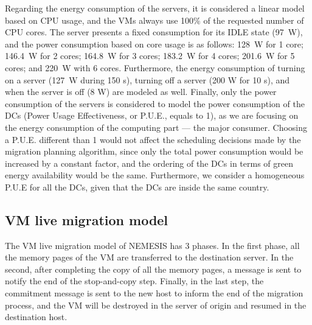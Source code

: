Regarding the energy consumption of the servers, it is considered a linear model based on CPU usage, and the VMs always use 100\% of the requested number of CPU cores. The server presents a fixed consumption for its IDLE state (97~W), and the power consumption based on core usage is as follows: 128~W for 1 core; 146.4~W for 2 cores; 164.8~W for 3 cores; 183.2~W for 4 cores; 201.6~W for 5 cores; and 220~W with 6 cores. Furthermore, the energy consumption of turning on a server (127~W during 150 s), turning off a server (200 W for 10 s), and when the server is off (8 W) are modeled as well. Finally, only the power consumption of the servers is considered to model the power consumption of the DCs (Power Usage Effectiveness, or P.U.E., equals to 1), as we are focusing on the energy consumption of the computing part --- the major consumer. Choosing a P.U.E. different than 1 would not affect the scheduling decisions made by the migration planning algorithm, since only the total power consumption would be increased by a constant factor, and the ordering of the DCs in terms of green energy availability would be the same. Furthermore, we consider a homogeneous P.U.E for all the DCs, given that the DCs are inside the same country.


\subsection{VM live migration model}

The VM live migration model of NEMESIS has 3 phases. In the first phase, all the memory pages of the VM are transferred to the destination server. In the second, after completing the copy of all the memory pages, a message is sent to notify the end of the stop-and-copy step. Finally, in the last step, the commitment message is sent to the new host to inform the end of the migration process, and the VM will be destroyed in the server of origin and resumed in the destination host. 

